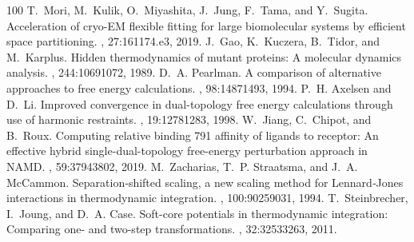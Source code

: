 \documentclass[a4paper,11pt,oneside,english]{sphinxmanual}
\begin{document}
\begin{sphinxthebibliography}{100}
T. Mori, M. Kulik, O. Miyashita, J. Jung, F. Tama, and Y. Sugita. Acceleration of cryo-EM flexible fitting for large biomolecular systems by efficient space partitioning. , 27:161\textendash{}174.e3, 2019.
J. Gao, K. Kuczera, B. Tidor, and M. Karplus. Hidden thermodynamics of mutant proteins: A molecular dynamics analysis. , 244:1069\textendash{}1072, 1989.
D. A. Pearlman. A comparison of alternative approaches to free energy calculations. , 98:1487\textendash{}1493, 1994.
P. H. Axelsen and D. Li. Improved convergence in dual-topology free energy calculations through use of harmonic restraints. , 19:1278\textendash{}1283, 1998.
W. Jiang, C. Chipot, and B. Roux. Computing relative binding 791 affinity of ligands to receptor: An effective hybrid single-dual-topology free-energy perturbation approach in NAMD. , 59:3794\textendash{}3802, 2019.
M. Zacharias, T. P. Straatsma, and J. A. McCammon. Separation‐shifted scaling, a new scaling method for Lennard‐Jones interactions in thermodynamic integration. , 100:9025\textendash{}9031, 1994.
T. Steinbrecher, I. Joung, and D. A. Case. Soft-core potentials in thermodynamic integration: Comparing one- and two-step transformations. , 32:3253\textendash{}3263, 2011.
\end{sphinxthebibliography}



\renewcommand{\indexname}{Index}
\printindex
\end{document}
